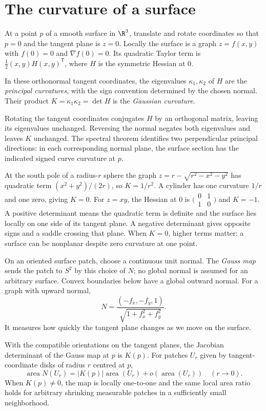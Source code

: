 \section{The curvature of a surface}

At a point $p$ of a smooth surface in $\R^3$, translate and rotate coordinates so that $p=0$ and the tangent plane is $z=0$. Locally the surface is a graph $z=f(x,y)$ with $f(0)=0$ and $\nabla f(0)=0$. Its quadratic Taylor term is $\tfrac12(x,y)H(x,y)^{\mathsf T}$, where $H$ is the symmetric Hessian at $0$.

\begin{definition}
In these orthonormal tangent coordinates, the eigenvalues $\kappa_1,\kappa_2$ of $H$ are the \emph{principal curvatures}, with the sign convention determined by the chosen normal. Their product $K=\kappa_1\kappa_2=\det H$ is the \emph{Gaussian curvature}.
\end{definition}

Rotating the tangent coordinates conjugates $H$ by an orthogonal matrix, leaving its eigenvalues unchanged. Reversing the normal negates both eigenvalues and leaves $K$ unchanged. The spectral theorem identifies two perpendicular principal directions: in each corresponding normal plane, the surface section has the indicated signed curve curvature at $p$.

At the south pole of a radius-$r$ sphere the graph $z=r-\sqrt{r^2-x^2-y^2}$ has quadratic term $(x^2+y^2)/(2r)$, so $K=1/r^2$. A cylinder has one curvature $1/r$ and one zero, giving $K=0$. For $z=xy$, the Hessian at $0$ is $\bigl(\begin{smallmatrix}0&1\\1&0\end{smallmatrix}\bigr)$ and $K=-1$. A positive determinant means the quadratic term is definite and the surface lies locally on one side of its tangent plane. A negative determinant gives opposite signs and a saddle crossing that plane. When $K=0$, higher terms matter: a surface can be nonplanar despite zero curvature at one point.

On an oriented surface patch, choose a continuous unit normal. The \emph{Gauss map} sends the patch to $S^2$ by this choice of $N$; no global normal is assumed for an arbitrary surface. Convex boundaries below have a global outward normal. For a graph with upward normal,
\[
N=\frac{(-f_x,-f_y,1)}{\sqrt{1+f_x^2+f_y^2}}.
\]
It measures how quickly the tangent plane changes as we move on the surface.

\begin{proposition}\label{geometry:prop:gaussmap}
With the compatible orientations on the tangent planes, the Jacobian determinant of the Gauss map at $p$ is $K(p)$. For patches $U_r$ given by tangent-coordinate disks of radius $r$ centred at $p$,
\[
\operatorname{area}N(U_r)=|K(p)|\operatorname{area}(U_r)+o(\operatorname{area}(U_r))
\quad(r\to0).
\]
When $K(p)\ne0$, the map is locally one-to-one and the same local area ratio holds for arbitrary shrinking measurable patches in a sufficiently small neighborhood.
\end{proposition}

